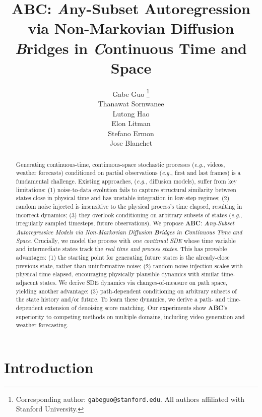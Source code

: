 \documentclass{article}
\title{ABC: \textit{A}ny-Subset Autoregression via Non-Markovian Diffusion \textit{B}ridges in \textit{C}ontinuous Time and Space}
\author{%
  Gabe Guo \thanks{Corresponding author: \texttt{gabeguo@stanford.edu}. All authors affiliated with Stanford University.} \\
  \And
  Thanawat Sornwanee \\
  \And
  Lutong Hao \\
  \And
  Elon Litman \\
  \And
  Stefano Ermon \\
  \And
  Jose Blanchet
}
\begin{document}
\maketitle

\begin{abstract}
Generating continuous-time, continuous-space stochastic processes (\textit{e.g.}, videos, weather forecasts) conditioned on partial observations (\textit{e.g.}, first and last frames) is a fundamental challenge.
Existing approaches, (\textit{e.g.}, diffusion models), suffer from key limitations: (1) noise-to-data evolution fails to capture structural similarity between states close in physical time and has unstable integration in low-step regimes; (2) random noise injected is insensitive to the physical process's time elapsed, resulting in incorrect dynamics; (3) they overlook conditioning on arbitrary subsets of states (\textit{e.g.}, irregularly sampled timesteps, future observations).
We propose \textbf{ABC}: \textit{\textbf{A}ny-Subset Autoregressive Models via Non-Markovian Diffusion \textbf{B}ridges in \textbf{C}ontinuous Time and Space}. Crucially, we model the process with \textit{one continual SDE} whose time variable and intermediate states track the \textit{real time and process states}.
This has provable advantages: (1) the starting point for generating future states is the already-close previous state, rather than uninformative noise; (2) random noise injection scales with physical time elapsed, encouraging physically plausible dynamics with similar time-adjacent states.
We derive SDE dynamics via changes-of-measure on path space, yielding another advantage: (3) path-dependent conditioning on arbitrary subsets of the state history and/or future.
To learn these dynamics, we derive a path- and time-dependent extension of denoising score matching.
Our experiments show \textbf{ABC}'s superiority to competing methods on multiple domains, including video generation and weather forecasting.

\end{abstract}

\section{Introduction}

\end{document}
